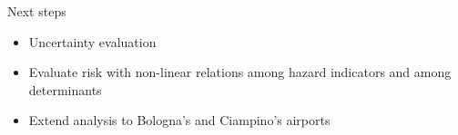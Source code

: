 \documentclass[aspectratio=43]{beamer}
\begin{document}
\begin{frame}{Next steps}
  \begin{itemize}
    \item Uncertainty evaluation
    \item Evaluate risk with non-linear relations among hazard indicators and among determinants
    \item Extend analysis to Bologna's and Ciampino's airports
  \end{itemize}
\end{frame}



\end{document}
